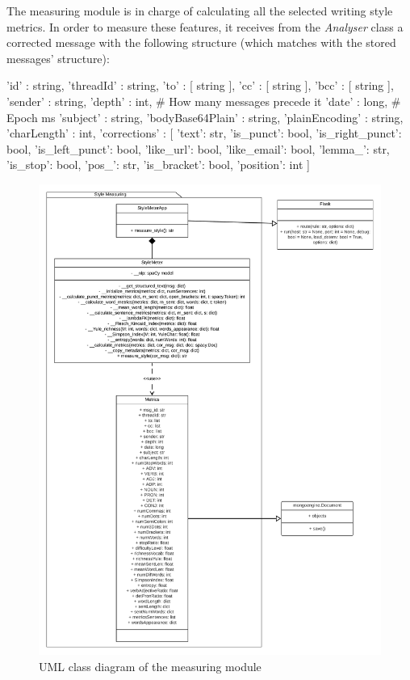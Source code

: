 The measuring module is in charge of calculating all the selected writing style metrics. In order to measure these features, it receives from the \textit{Analyser} class a corrected message with the following structure (which matches with the stored messages' structure):

\begin{python}
	{
		'id' : string,
		'threadId' : string,
		'to' : [ string ],
		'cc' : [ string ],
		'bcc' : [ string ],
		'sender' : string,
		'depth' : int,               # How many messages precede it
		'date' : long,               # Epoch ms
		'subject' : string,
		'bodyBase64Plain' : string,
		'plainEncoding' : string,
		'charLength' : int,
		'corrections' : [
		{
			'text': str,
			'is_punct': bool,
			'is_right_punct': bool,
			'is_left_punct': bool,
			'like_url': bool,
			'like_email': bool,
			'lemma_': str,
			'is_stop': bool,
			'pos_': str,
			'is_bracket': bool,
			'position': int
		}
		]
	}
\end{python}

\begin{figure}[p]
	\centering%
	\centerline{\includegraphics[height=0.8\paperheight]{Imagenes/Bitmap/Analyser/metUML.png}}%
	\caption{UML class diagram of the measuring module}%
	\label{fig:umlmet}
\end{figure}

